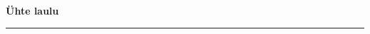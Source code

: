 \documentclass[10pt]{book}
\begin{document}
{
  \samepage
  \raggedbottom
  \raggedright
  \sloppy


  \vspace{0.2in}

  \noindent\begin{minipage}{.1\textwidth}
    \hfill\vspace{0.1in}
  \end{minipage}%
  \noindent\begin{minipage}{.8\textwidth}
    \centering
    \bfseries
    \large \"Uhte laulu
  \end{minipage}%
  \noindent\begin{minipage}{.1\textwidth}
      \hfill\vspace{0.1in}
  \end{minipage}

  \nopagebreak[4]
  \vspace{0.1in}
  \nopagebreak[4]
  \hrule height 0.05ex
  \nopagebreak[4]
  \vspace{-0.05in}




}
\end{document}
